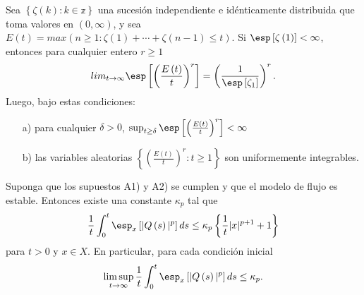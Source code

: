 \begin{Lemma}\label{Lema.5.2}
 Sea $\left\{\zeta\left(k\right):k\in \mathbb{z}\right\}$ una sucesi\'on independiente e id\'enticamente distribuida que toma valores en $\left(0,\infty\right)$,
y sea
$E\left(t\right)=max\left(n\geq1:\zeta\left(1\right)+\cdots+\zeta\left(n-1\right)\leq
t\right)$. Si $\esp\left[\zeta\left(1\right)\right]<\infty$,
entonces para cualquier entero $r\geq1$
\begin{equation}
 lim_{t\rightarrow\infty}\esp\left[\left(\frac{E\left(t\right)}{t}\right)^{r}\right]=\left(\frac{1}{\esp\left[\zeta_{1}\right]}\right)^{r}.
\end{equation}
Luego, bajo estas condiciones:
\begin{itemize}
 \item[a)] para cualquier $\delta>0$, $\sup_{t\geq\delta}\esp\left[\left(\frac{E\left(t\right)}{t}\right)^{r}\right]<\infty$
\item[b)] las variables aleatorias
$\left\{\left(\frac{E\left(t\right)}{t}\right)^{r}:t\geq1\right\}$
son uniformemente integrables.
\end{itemize}
\end{Lemma}

\begin{Teo}\label{Tma.5.5}
Suponga que los supuestos A1) y A2) se cumplen y que el modelo de
flujo es estable. Entonces existe una constante $\kappa_{p}$ tal
que
\begin{equation}
\frac{1}{t}\int_{0}^{t}\esp_{x}\left[|Q\left(s\right)|^{p}\right]ds\leq\kappa_{p}\left\{\frac{1}{t}|x|^{p+1}+1\right\}
\end{equation}
para $t>0$ y $x\in X$. En particular, para cada condici\'on inicial
\begin{eqnarray*}
\limsup_{t\rightarrow\infty}\frac{1}{t}\int_{0}^{t}\esp_{x}\left[|Q\left(s\right)|^{p}\right]ds\leq\kappa_{p}.
\end{eqnarray*}
\end{Teo}

